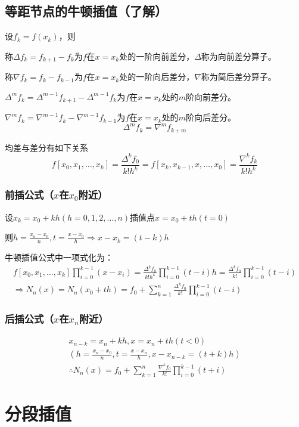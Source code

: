\documentclass[UTF8,a4paper,11pt,oneside]{ctexbook}
\begin{document}
\subsection{等距节点的牛顿插值（了解）}

设\(f_k=f(x_k)\)，则

称\(\Delta f_k=f_{k+1}-f_k\)为\(f\)在\(x=x_k\)处的一阶向前差分，\(\Delta\)称为向前差分算子。

称\(\nabla f_k=f_{k}-f_{k-1}\)为\(f\)在\(x=x_k\)处的一阶向后差分，\(\nabla\)称为简后差分算子。

\(\Delta^mf_k=\Delta^{m-1}f_{k+1}-\Delta^{m-1}f_k\)为\(f\)在\(x=x_k\)处的\(m\)阶向前差分。

\(\nabla^mf_k=\nabla^{m-1}f_k-\nabla^{m-1}f_{k-1}\)为\(f\)在\(x=x_k\)处的\(m\)阶向后差分。
\[
\Delta^mf_k=\nabla^mf_{k+m}
\]

均差与差分有如下关系
\[
f[x_0,x_1,\ldots,x_k]=\frac{\Delta^kf_0}{k!h^k}=f[x_k,x_{k-1},x,\ldots,x_0]=\frac{\nabla^kf_k}{k!h^k}
\]

\subsubsection{前插公式（\(x\)在\(x_0\)附近）}

设\(x_k=x_0+kh(h=0,1,2,\ldots,n)\)插值点\(x=x_0+th(t=0)\)

则\(h=\frac{x_n-x_0}{n},t=\frac{x-x_0}{h}\Rightarrow x-x_k=(t-k)h\)

牛顿插值公式中一项式化为：
\begin{gather*}
    f[x_0,x_1,\ldots,x_k]\prod_{i=0}^{k-1}(x-x_i)=\frac{\Delta^kf_0}{k!h^k}\prod_{i=0}^{k-1}(t-i)h=\frac{\Delta^kf_0}{k!}\prod_{i=0}^{k-1}(t-i)\\
    \Rightarrow N_n(x)=N_n(x_0+th)=f_0+\sum_{k=1}^n\frac{\Delta^kf_0}{k!}\prod_{i=0}^{k-1}(t-i)
\end{gather*}

\subsubsection{后插公式（\(x\)在\(x_n\)附近）}
\begin{gather*}
    x_{n-k}=x_n+kh,x=x_n+th(t<0)\\
    (h=\frac{x_n-x_0}{n},t=\frac{x-x_n}{h},x-x_{n-k}=(t+k)h)\\
    \therefore N_n(x)=f_0+\sum_{k=1}^n\frac{\nabla^kf_0}{k!}\prod_{i=0}^{k-1}(t+i)
\end{gather*}

\section{分段插值}
\end{document}
